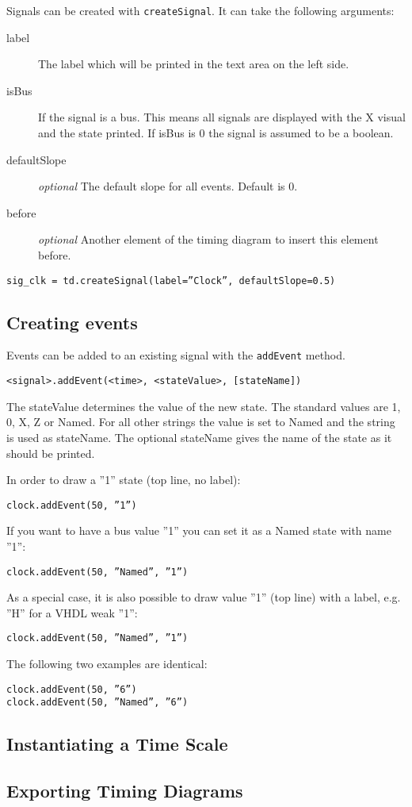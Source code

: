 \documentclass[11pt]{article}
\begin{document}
Signals can be created with \texttt{createSignal}. It can take the following
arguments:

\begin{description}
\item[label] The label which will be printed in the text area on the left side.
\item[isBus] If the signal is a bus. This means all signals are displayed with the X visual
and the state printed. If isBus is 0 the signal is assumed to be a boolean. 
\item[defaultSlope] \emph{optional} The default slope for all events. Default is 0.
\item[before] \emph{optional} Another element of the timing diagram to insert this element before.  
\end{description}

\begin{center}
  \texttt{sig\_clk = td.createSignal(label=''Clock'', defaultSlope=0.5)}
\end{center}

\subsection{Creating events}
\label{sec:evt}

Events can be added to an existing signal with the \texttt{addEvent} method.

\texttt{<signal>.addEvent(<time>, <stateValue>, [stateName])}

The stateValue determines the value of the new state. The standard values are 1,
0, X, Z or Named. For all other strings the value is set to Named and the string
is used as stateName. 
The optional stateName gives the name of the state as it should be printed. 

In order to draw a ''1'' state (top line, no label):

\texttt{clock.addEvent(50, ''1'')}

If you want to have a bus value ''1'' you can set it as a Named state with name ''1'':

\texttt{clock.addEvent(50, ''Named'', ''1'')}

As a special case, it is also possible to draw value ''1'' (top line) with a
label, e.g. ''H'' for a VHDL weak ''1'':

\texttt{clock.addEvent(50, ''Named'', ''1'')}

The following two examples are identical:

\texttt{clock.addEvent(50, ''6'')}\\
\texttt{clock.addEvent(50, ''Named'', ''6'')}



\subsection{Instantiating a Time Scale}
\label{sec:tis}



\subsection{Exporting Timing Diagrams}
\label{sec:exp}
\end{document}
